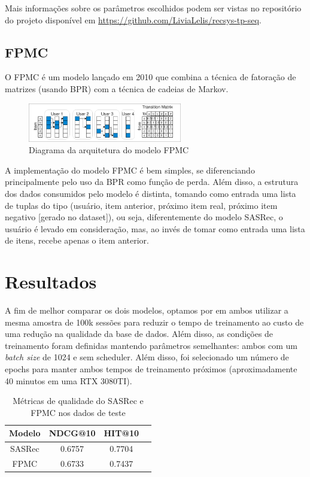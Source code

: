 Mais informações sobre os parâmetros escolhidos podem ser vistas
no repositório do projeto disponível em \url{https://github.com/LiviaLelis/recsys-tp-seq}.

\subsection{FPMC}

O FPMC \cite{fpmc} é um modelo lançado em 2010 que combina a técnica de 
fatoração de matrizes (usando BPR) com a técnica de cadeias de Markov.

\begin{figure}[H]
    \centering
    \includegraphics[width=0.6\textwidth]{../assets/fpmc-diagram.png}
    \caption{Diagrama da arquitetura do modelo FPMC \cite{fpmc}}
    \label{fig:fpmc-diagram}
\end{figure}

A implementação do modelo FPMC é bem simples, se diferenciando principalmente
pelo uso da BPR como função de perda. Além disso, a estrutura dos dados
consumidos pelo modelo é distinta, tomando como entrada uma lista de tuplas
do tipo (usuário, item anterior, próximo item real, próximo item negativo 
[gerado no dataset]), ou seja, diferentemente do modelo SASRec, o usuário é
levado em consideração, mas, ao invés de tomar como entrada uma lista de 
itens, recebe apenas o item anterior.

\section*{Resultados}

A fim de melhor comparar os dois modelos, optamos por em ambos utilizar a mesma
amostra de 100k sessões para reduzir o tempo de treinamento ao custo de uma
redução na qualidade da base de dados. Além disso, as condições de treinamento
foram definidas mantendo parâmetros semelhantes: ambos com um \textit{batch size}
de 1024 e sem scheduler. Além disso, foi selecionado um número de epochs para 
manter ambos tempos de treinamento próximos (aproximadamente 40 minutos em uma
RTX 3080TI).


\begin{table}[H]
    \centering
    \begin{tabular}{|c|c|c|c|}
        \hline
        Modelo & NDCG@10 & HIT@10 \\ \hline
        SASRec & 0.6757 & 0.7704 \\ \hline
        FPMC & 0.6733 & 0.7437 \\ \hline
    \end{tabular}
    \caption{Métricas de qualidade do SASRec e FPMC nos dados de teste}
    \label{tab:results}
\end{table}

